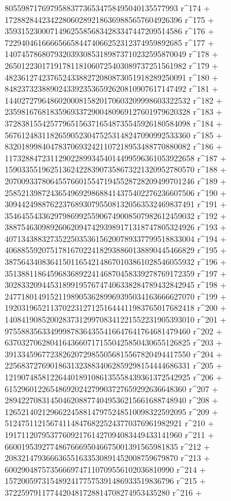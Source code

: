        805598717697958837736534758495040135577993 r^174 + 
       1728828442342280602892186369885657604926396 r^175 + 
       3593152300071496255856834283347447209514586 r^176 + 
       7229404616666566584474066252312374959892685 r^177 + 
       14074578680793203930853189873710232595870049 r^178 + 
       26501223017191781181060725403089737251561982 r^179 + 
       48236127423765243388272080873051918289250091 r^180 + 
       84823732388902433923536592620810907617147492 r^181 + 
       144027279648602000815820170603209998603322532 r^182 + 
       235981676818359693372900480969127601979620328 r^183 + 
       372838155425779651563716548735545926180584098 r^184 + 
       567612483118265905230475253148247090992533360 r^185 + 
       832018998404783706932421107218953488770880082 r^186 + 
       1173288472311290228993454014499596361053922658 r^187 + 
       1590335519625136242283907358673221320952780570 r^188 + 
       2070093378064557660155471945528728209499701246 r^189 + 
       2585213987243654969298688414375402276236607506 r^190 + 
       3094424988762237689307955081320563532469837491 r^191 + 
       3546455433629798699255906749008507982612459032 r^192 + 
       3887546309892606209474293989171318747805324926 r^193 + 
       4071343883273522503536156200789337799518833004 r^194 + 
       4068855920751781670224182938860138890445466829 r^195 + 
       3875643408364150116542148670103861028546055932 r^196 + 
       3513881186459683689224146870458339278769172359 r^197 + 
       3028332094453189919576747406338284789432842945 r^198 + 
       2477180149152119890536289969395034163666627070 r^199 + 
       1920319652113702231271251644411983765017682418 r^200 + 
       1408419085200283731299708341221552231905393010 r^201 + 
       975588356334999878364355416647641764681479460 r^202 + 
       637032706280416436607171550425850430655126825 r^203 + 
       391334596772382620729855056815567820494417550 r^204 + 
       225683727690186313238834062859298154444686331 r^205 + 
       121907485812264401891086135558439361372542925 r^206 + 
       61529601226548692024279903727659292636648360 r^207 + 
       28942270831450462088774049536215661688748940 r^208 + 
       12652140212966224588147975248510098322592095 r^209 + 
       5124751121567411484768225243770376961982921 r^210 + 
       1917112079537760921761427094083449433141960 r^211 + 
       660019539277486766695046675001391565981835 r^212 + 
       208321479366636551633530891452008759679870 r^213 + 
       60029048757356669747110709556102036810990 r^214 + 
       15720059731548924177575391486933519836796 r^215 + 
       3722597911774420481728814708274953435280 r^216 + 
